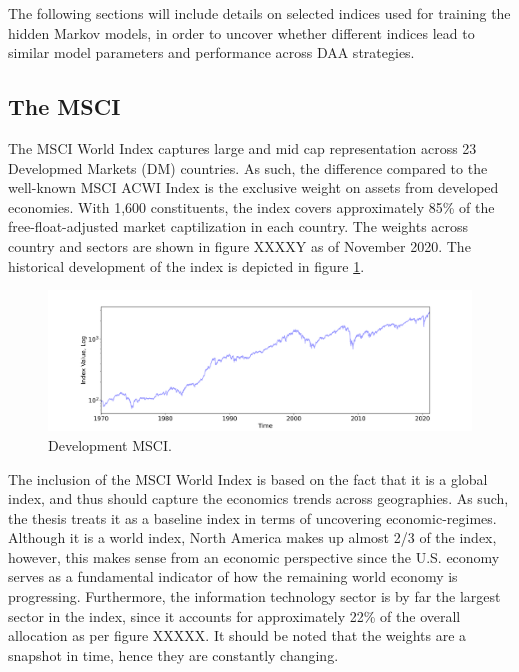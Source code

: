 The following sections will include details on selected indices used for training the hidden Markov models, in order to uncover whether different indices lead to similar model parameters and performance across DAA strategies. 

\subsection{The MSCI}
\label{subsection: MSCI Index}
The MSCI World Index captures large and mid cap representation across 23 Developmed Markets (DM) countries. As such, the difference compared to the well-known MSCI ACWI Index is the exclusive weight on assets from developed economies. With 1,600 constituents, the index covers approximately 85\% of the free-float-adjusted market captilization in each country. The weights across country and sectors are shown in figure XXXXY as of November 2020. The historical development of the index is depicted in figure \ref{fig:MSCI_index}. 
 
\begin{figure}[H] 
    \centering
    \includegraphics[width=1.0\textwidth]{analysis/data_description/images/MSCI_index.png}
    \caption{Development MSCI.}
    \label{fig:MSCI_index}
\end{figure}


The inclusion of the MSCI World Index is based on the fact that it is a global index, and thus should capture the economics trends across geographies. As such, the thesis treats it as a baseline index in terms of uncovering economic-regimes. Although it is a world index, North America makes up almost 2/3 of the index, however, this makes sense from an economic perspective since the U.S. economy serves as a fundamental indicator of how the remaining world economy is progressing. Furthermore, the information technology sector is by far the largest sector in the index, since it accounts for approximately 22\% of the overall allocation as per figure XXXXX. It should be noted that the weights are a snapshot in time, hence they are constantly changing. 

